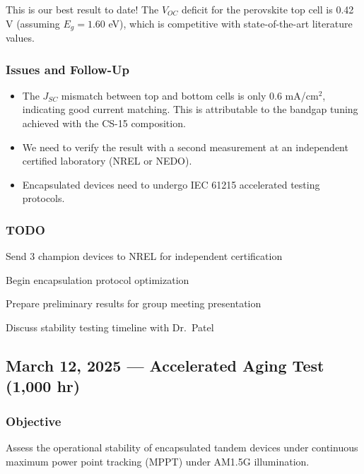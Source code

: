 \documentclass[
    language=english,
    doctype=research-notebook,
    institution=none,
]{../../omnilatex}
\begin{document}
This is our best result to date! The $V_{OC}$ deficit for the perovskite
top cell is 0.42 V (assuming $E_g = 1.60$ eV), which is competitive with
state-of-the-art literature values.

\subsubsection{Issues and Follow-Up}
\begin{itemize}
    \item The $J_{SC}$ mismatch between top and bottom cells is only
          0.6 mA/cm$^2$, indicating good current matching. This is
          attributable to the bandgap tuning achieved with the CS-15
          composition.
    \item We need to verify the result with a second measurement at
          an independent certified laboratory (NREL or NEDO).
    \item Encapsulated devices need to undergo IEC 61215 accelerated
          testing protocols.
\end{itemize}

\subsubsection{TODO}
\begin{todo}
    \item Send 3 champion devices to NREL for independent certification
    \item Begin encapsulation protocol optimization
    \item Prepare preliminary results for group meeting presentation
    \item Discuss stability testing timeline with Dr.\ Patel
\end{todo}

\subsection{March 12, 2025 --- Accelerated Aging Test (1,000 hr)}
\label{entry:mar12}

\subsubsection{Objective}
Assess the operational stability of encapsulated tandem devices under
continuous maximum power point tracking (MPPT) under AM1.5G illumination.
\end{document}
